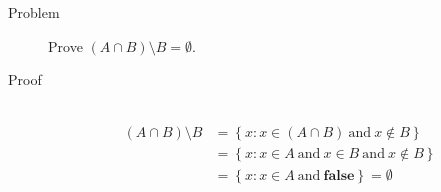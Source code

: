 \begin{description}
\item[Problem]
Prove $(A \cap B) \setminus B = \emptyset$.

\item[Proof]~\\
\begin{equation*}
\begin{aligned}
(A \cap B) \setminus B
                 &= \left\{ x : x \in (A \cap B)\ \text{and}\ x \not \in B
                    \right\} \\
                 &= \left\{ x : x \in A\ \text{and}\ x \in B\ \text{and}\ x
                    \not \in B\right\} \\
                 &= \left\{ x : x \in A\ \text{and}\ \mathbf{false}\right\}
                  = \emptyset
\end{aligned}
\end{equation*}
\end{description}
